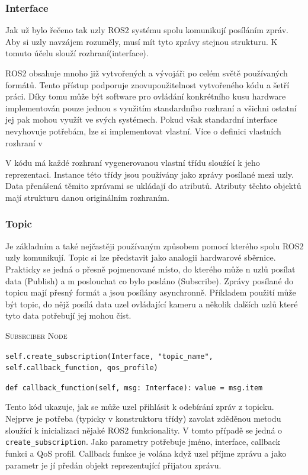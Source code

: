 \subsubsection*{Interface}
Jak už bylo řečeno tak uzly ROS2 systému spolu komunikují posíláním zpráv. Aby si uzly navzájem rozuměly, musí mít tyto zprávy stejnou strukturu. K tomuto účelu slouží rozhraní(interface). 

ROS2 obsahuje mnoho již vytvořených a vývojáři po celém světě používaných formátů. Tento přístup podporuje znovupoužitelnost vytvořeného kódu a šetří práci. Díky tomu může být software pro ovládání konkrétního kusu hardware implementován pouze jednou s využitím standardního rozhraní a všichni ostatní jej pak mohou využít ve svých systémech. Pokud však standardní interface nevyhovuje potřebám, lze si implementovat vlastní. Více o definici vlastních rozhraní v %

V kódu má každé rozhraní vygenerovanou vlastní třídu sloužící k jeho reprezentaci. Instance této třídy jsou používány jako zprávy posílané mezi uzly. Data přenášená těmito zprávami se ukládají do atributů. Atributy těchto objektů mají strukturu danou originálním rozhraním.

\subsubsection*{Topic}
Je základním a také nejčastěji používaným způsobem pomocí kterého spolu ROS2 uzly komunikují. Topic si lze představit jako analogii hardwarové sběrnice. Prakticky se jedná o přesně pojmenované místo, do kterého může n uzlů posílat data (Publish) a m poslouchat co bylo posláno (Subscribe). Zprávy posílané do topicu mají přesný formát a jsou posílány asynchronně. Příkladem použití může být topic, do nějž posílá data uzel ovládající kameru a několik dalších uzlů které tyto data potřebují jej mohou číst. \cite{ros2_introduction}

\begin{algorithm}[h!]
	\label{}
	\caption{\textsc{Subsrciber Node}}
	
	\DontPrintSemicolon
	\SetAlgoNoLine
	\SetNlSty{}{}{:}
	\SetNlSkip{-1.1em}
	
	\BlankLine \Indp\Indpp
	\texttt{self.create\_subscription(Interface, "topic\_name", self.callback\_function, qos\_profile)}\;
	
	\BlankLine
	\texttt{def callback\_function(self, msg: Interface):}\;
	\Indp\Indp
	\texttt{value = msg.item}\;
\end{algorithm}
Tento kód ukazuje, jak se může uzel přihlásit k odebírání zpráv z topicku. Nejprve je potřeba (typicky v konstruktoru třídy) zavolat zděděnou metodu sloužící k inicializaci nějaké ROS2 funkcionality. V tomto případě se jedná o \verb|create_subscription|. Jako parametry potřebuje jméno, interface, callback funkci a QoS profil. Callback funkce je volána když uzel příjme zprávu a jako parametr je jí předán objekt reprezentující přijatou zprávu. \cite{ros2_documentation}

